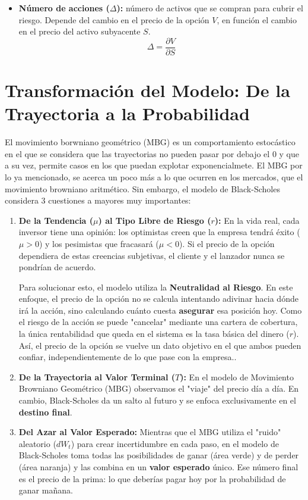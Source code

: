 \documentclass[11pt]{article}
\newcommand{\comillas}[1]{"#1"} %
\begin{document}
\begin{itemize}
		\item \textbf{Número de acciones ($\Delta$):} número de activos que se compran para cubrir el riesgo. Depende del cambio en el precio de la opción $V$, en función el cambio en el precio del activo subyacente $S$.
		\begin{equation}
			\Delta = \frac{\partial V}{\partial S}
		\end{equation}
		
		
	\end{itemize}
	\section{Transformación del Modelo: De la Trayectoria a la Probabilidad}
	
		El movimiento borwniano geométrico (MBG) es un comportamiento estocástico en el que se considera que las trayectorias no pueden pasar por debajo el 0 y que a su vez, permite casos en los que puedan explotar exponencialmete. El MBG por lo ya mencionado, se acerca un poco más a lo que ocurren en los mercados, que el movimiento browniano aritmético. Sin embargo, el modelo de Black-Scholes considera 3 cuestiones a mayores muy importantes:
			
		\begin{enumerate}		
			\item \textbf{De la Tendencia ($\mu$) al Tipo Libre de Riesgo ($r$):} 
			En la vida real, cada inversor tiene una opinión: los optimistas creen que la empresa tendrá éxito ($\mu > 0$) y los pesimistas que fracasará ($\mu < 0$). Si el precio de la opción dependiera de estas creencias subjetivas, el cliente y el lanzador nunca se pondrían de acuerdo. 
					
			Para solucionar esto, el modelo utiliza la \textbf{Neutralidad al Riesgo}. En este enfoque, el precio de la opción no se calcula intentando adivinar hacia dónde irá la acción, sino calculando cuánto cuesta \textbf{asegurar} esa posición hoy. Como el riesgo de la acción se puede \comillas{cancelar} mediante una cartera de cobertura, la única rentabilidad que queda en el sistema es la tasa básica del dinero ($r$). Así, el precio de la opción se vuelve un dato objetivo en el que ambos pueden confiar, independientemente de lo que pase con la empresa..
					
			\item \textbf{De la Trayectoria al Valor Terminal ($T$):} 
			En el modelo de Movimiento Browniano Geométrico (MBG) observamos el "viaje" del precio día a día. En cambio, Black-Scholes da un salto al futuro y se enfoca exclusivamente en el \textbf{destino final}.
					
			\item \textbf{Del Azar al Valor Esperado:} 
			Mientras que el MBG utiliza el \comillas{ruido} aleatorio ($dW_t$) para crear incertidumbre en cada paso, en el modelo de Black-Scholes toma todas las posibilidades de ganar (área verde) y de perder (área naranja) y las combina en un \textbf{valor esperado} único. Ese número final es el precio de la prima: lo que deberías pagar hoy por la probabilidad de ganar mañana.
		\end{enumerate}
		
\end{document}
